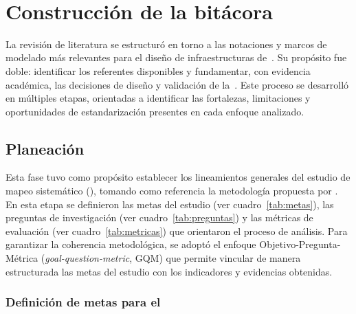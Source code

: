 \label{cap:revisionLiteratura}
\mbox{}\\
\section{Construcción de la bitácora}

La revisión de literatura se estructuró en torno a las notaciones y marcos de modelado más relevantes para el diseño de infraestructuras de~\TI. Su propósito fue doble: identificar los referentes disponibles y fundamentar, con evidencia académica, las decisiones de diseño y validación de la~\NDITI. Este proceso se desarrolló en múltiples etapas, orientadas a identificar las fortalezas, limitaciones y oportunidades de estandarización presentes en cada enfoque analizado.

\subsection{Planeación}

Esta fase tuvo como propósito establecer los lineamientos generales del estudio de mapeo sistemático (\SMS), tomando como referencia la metodología propuesta por \cite{Sepulveda2021}.
En esta etapa se definieron las metas del estudio (ver cuadro~\ref{tab:metas}), las preguntas de investigación (ver cuadro~\ref{tab:preguntas}) y las métricas de evaluación (ver cuadro~\ref{tab:metricas}) que orientaron el proceso de análisis. 
Para garantizar la coherencia metodológica, se adoptó el enfoque Objetivo-Pregunta-Métrica (\textit{goal-question-metric}, GQM) que permite vincular de manera estructurada las metas del estudio con los indicadores y evidencias obtenidas.

\subsubsection{Definición de metas para el \SMS}

